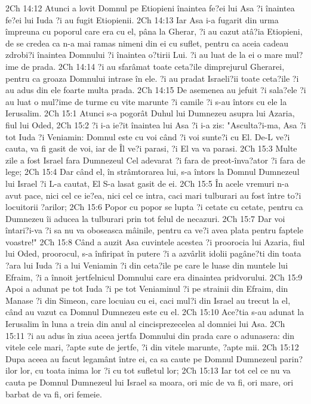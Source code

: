 2Ch 14:12  Atunci a lovit Domnul pe Etiopieni înaintea fe?ei lui Asa ?i înaintea fe?ei lui Iuda ?i au fugit Etiopienii.
2Ch 14:13  Iar Asa i-a fugarit din urma împreuna cu poporul care era cu el, pâna la Gherar, ?i au cazut atâ?ia Etiopieni, de se credea ca n-a mai ramas nimeni din ei cu suflet, pentru ca aceia cadeau zdrobi?i înaintea Domnului ?i înaintea o?tirii Lui. ?i au luat de la ei o mare mul?ime de prada.
2Ch 14:14  ?i au sfarâmat toate ceta?ile dimprejurul Gherarei, pentru ca groaza Domnului intrase în ele. ?i au pradat Israeli?ii toate ceta?ile ?i au adus din ele foarte multa prada.
2Ch 14:15  De asemenea au jefuit ?i sala?ele ?i au luat o mul?ime de turme cu vite marunte ?i camile ?i s-au întors cu ele la Ierusalim.
2Ch 15:1  Atunci s-a pogorât Duhul lui Dumnezeu asupra lui Azaria, fiul lui Oded,
2Ch 15:2  ?i i-a ie?it înaintea lui Asa ?i i-a zis: "Asculta?i-ma, Asa ?i tot Iuda ?i Veniamin: Domnul este cu voi când ?i voi sunte?i cu El. De-L ve?i cauta, va fi gasit de voi, iar de Îl ve?i parasi, ?i El va va parasi.
2Ch 15:3  Multe zile a fost Israel fara Dumnezeul Cel adevarat ?i fara de preot-înva?ator ?i fara de lege;
2Ch 15:4  Dar când el, în strâmtorarea lui, s-a întors la Domnul Dumnezeul lui Israel ?i L-a cautat, El S-a lasat gasit de ei.
2Ch 15:5  În acele vremuri n-a avut pace, nici cel ce ie?ea, nici cel ce intra, caci mari tulburari au fost între to?i locuitorii ?arilor;
2Ch 15:6  Popor cu popor se lupta ?i cetate cu cetate, pentru ca Dumnezeu îi aducea la tulburari prin tot felul de necazuri.
2Ch 15:7  Dar voi întari?i-va ?i sa nu va oboseasca mâinile, pentru ca ve?i avea plata pentru faptele voastre!"
2Ch 15:8  Când a auzit Asa cuvintele acestea ?i proorocia lui Azaria, fiul lui Oded, proorocul, s-a înfiripat în putere ?i a azvârlit idolii pagâne?ti din toata ?ara lui Iuda ?i a lui Veniamin ?i din ceta?ile pe care le luase din muntele lui Efraim, ?i a înnoit jertfelnicul Domnului care era dinaintea pridvorului.
2Ch 15:9  Apoi a adunat pe tot Iuda ?i pe tot Veniaminul ?i pe strainii din Efraim, din Manase ?i din Simeon, care locuiau cu ei, caci mul?i din Israel au trecut la el, când au vazut ca Domnul Dumnezeu este cu el.
2Ch 15:10  Ace?tia s-au adunat la Ierusalim în luna a treia din anul al cincisprezecelea al domniei lui Asa.
2Ch 15:11  ?i au adus în ziua aceea jertfa Domnului din prada care o adunasera: din vitele cele mari, ?apte sute de jertfe, ?i din vitele marunte, ?apte mii.
2Ch 15:12  Dupa aceea au facut legamânt între ei, ca sa caute pe Domnul Dumnezeul parin?ilor lor, cu toata inima lor ?i cu tot sufletul lor;
2Ch 15:13  Iar tot cel ce nu va cauta pe Domnul Dumnezeul lui Israel sa moara, ori mic de va fi, ori mare, ori barbat de va fi, ori femeie.
